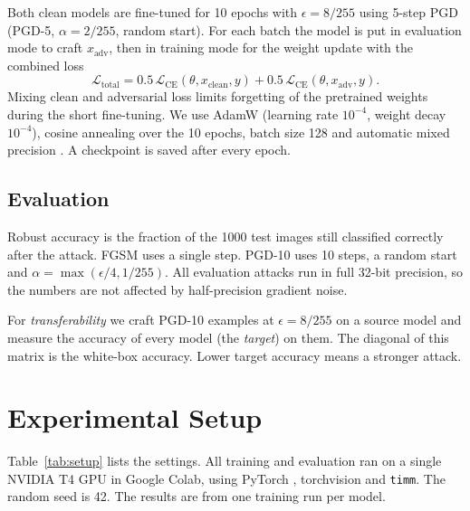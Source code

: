 \documentclass[a4paper,11pt]{article}
\begin{document}
Both clean models are fine-tuned for 10 epochs with $\epsilon = 8/255$
using 5-step PGD (PGD-5, $\alpha = 2/255$, random start). For each batch
the model is put in evaluation mode to craft $x_{\mathrm{adv}}$, then in
training mode for the weight update with the combined loss
\begin{equation}
\mathcal{L}_{\mathrm{total}} = 0.5\,\mathcal{L}_{\mathrm{CE}}(\theta,
x_{\mathrm{clean}}, y) + 0.5\,\mathcal{L}_{\mathrm{CE}}(\theta,
x_{\mathrm{adv}}, y).
\end{equation}
Mixing clean and adversarial loss limits forgetting of the pretrained
weights during the short fine-tuning. We use AdamW
\cite{Loshchilov:19} (learning rate $10^{-4}$, weight decay $10^{-4}$),
cosine annealing over the 10 epochs, batch size 128 and automatic mixed
precision \cite{Micikevicius:18}. A checkpoint is saved after every epoch.

\subsection{Evaluation}

Robust accuracy is the fraction of the 1000 test images still classified
correctly after the attack. FGSM uses a single step. PGD-10 uses 10 steps,
a random start and $\alpha = \max(\epsilon/4, 1/255)$. All evaluation
attacks run in full 32-bit precision, so the numbers are not affected by
half-precision gradient noise.

For \emph{transferability} we craft PGD-10 examples at $\epsilon = 8/255$
on a source model and measure the accuracy of every model (the
\emph{target}) on them. The diagonal of this matrix is the white-box
accuracy. Lower target accuracy means a stronger attack.

\section{Experimental Setup}

Table~\ref{tab:setup} lists the settings. All training and evaluation ran
on a single NVIDIA T4 GPU in Google Colab, using PyTorch
\cite{Paszke:19}, torchvision and \texttt{timm}. The random seed is 42.
The results are from one training run per model.
\end{document}
